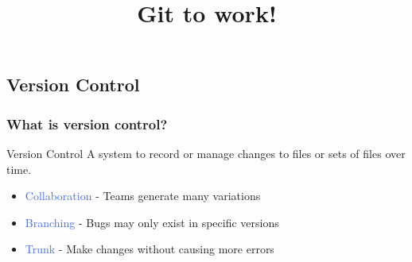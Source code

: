 \documentclass[11pt,professionalfonts]{beamer}
\title[Version Control]{\large\bf  Git to work!}
\author{\vspace*{-0.3cm}}
\institute{
	\footnotesize
	{\normalsize\bf{Shankar Kulumani}}\\
	\vspace*{0.2cm}
  	\bf{Department of Mechanical \& Aerospace Engineering}\\ \vspace*{0.5cm}
 	\begin{figure} %
       	\texttt{[image: gw\_txh\_2cs\_pos]}
  	\end{figure}
}
\date{}
\def\Emph{\textcolor{RoyalBlue}}
\begin{document}

\setcounter{framenumber}{-1}
\begin{frame} %
  \titlepage
\end{frame}   %

\section*{}
\subsection*{Version Control}  

\begin{frame} %
\frametitle{What is version control?} %

\begin{block}{Version Control}
    A system to record or manage changes to files or sets of files over time.
\end{block}

\pause

\begin{itemize}
    \item<1-> \Emph{Collaboration} - Teams generate many variations 
    \item<2-> \Emph{Branching} - Bugs may only exist in specific versions
    \item<3-> \Emph{Trunk} - Make changes without causing more errors
\end{itemize}{}

\end{frame}   %
\end{document}
